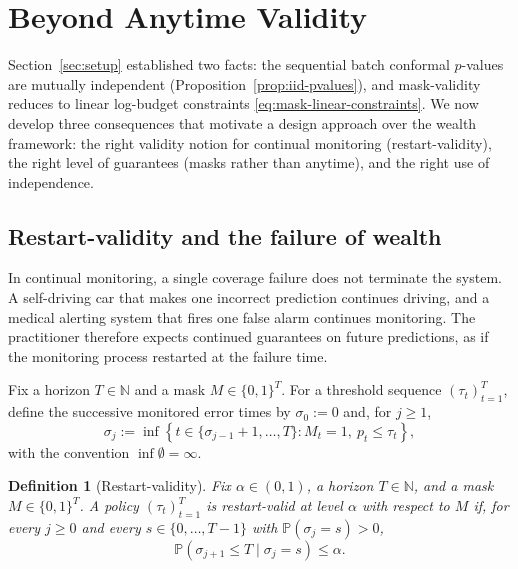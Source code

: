 \documentclass{uai2026} %
\newtheorem{definition}[theorem]{Definition}
\newcommand{\N}{\mathbb{N}}
\newcommand{\1}{\mathbf{1}}
\newcommand{\prob}{\mathbb{P}}
\begin{document}
\section{Beyond Anytime Validity}
\label{sec:beyond}

Section~\ref{sec:setup} established two facts: the sequential batch conformal $p$-values are mutually independent (Proposition~\ref{prop:iid-pvalues}), and mask-validity reduces to linear log-budget constraints \eqref{eq:mask-linear-constraints}.
We now develop three consequences that motivate a design approach over the wealth framework: the right validity notion for continual monitoring (restart-validity), the right level of guarantees (masks rather than anytime), and the right use of independence.

\subsection{Restart-validity and the failure of wealth}
\label{sec:restart}

In continual monitoring, a single coverage failure does not terminate the system.
A self-driving car that makes one incorrect prediction continues driving, and a medical alerting system that fires one false alarm continues monitoring.
The practitioner therefore expects continued guarantees on future predictions, as if the monitoring process restarted at the failure time.

Fix a horizon $T\in\N$ and a mask $M\in\{0,1\}^T$.
For a threshold sequence $(\tau_t)_{t=1}^T$, define the successive monitored error times by $\sigma_0:=0$ and, for $j\ge 1$,
\begin{equation}
  \label{eq:sigma-j}
  \sigma_j:=\inf\left\{t\in\{\sigma_{j-1}+1,\dots,T\}: M_t=1,\ p_t\le \tau_t\right\},
\end{equation}
with the convention $\inf\emptyset=\infty$.

\begin{definition}[Restart-validity]
  \label{def:restart-valid}
  Fix $\alpha\in(0,1)$, a horizon $T\in\N$, and a mask $M\in\{0,1\}^T$.
  A policy $(\tau_t)_{t=1}^T$ is restart-valid at level $\alpha$ with respect to $M$ if, for every $j\ge 0$ and every $s\in\{0,\dots,T-1\}$ with $\prob(\sigma_j=s)>0$,
  \begin{equation*}
    \prob(\sigma_{j+1}\le T\mid \sigma_j=s)\le \alpha.
  \end{equation*}
\end{definition}
\end{document}
